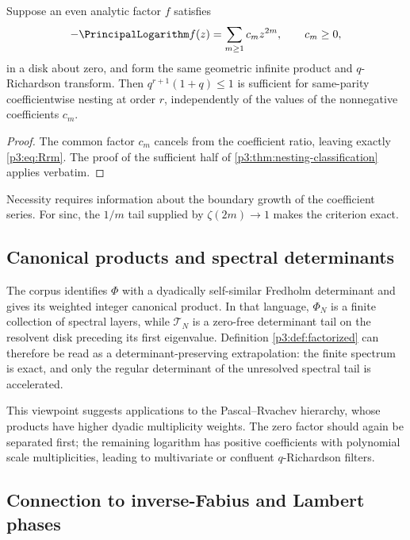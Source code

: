 \documentclass[11pt]{article}
\numberwithin{equation}{section}
\theoremstyle{definition}
\theoremstyle{remark}
\begin{document}
\begin{proposition}
\label{p3:prop:universal-mask}
Suppose an even analytic factor $f$ satisfies
\[
 -\PrincipalLogarithm f(z)=\sum_{m\ge1}c_mz^{2m},\qquad c_m\ge0,
\]
in a disk about zero, and form the same geometric infinite product and $q$-Richardson
transform.  Then $q^{r+1}(1+q)\le1$ is sufficient for same-parity coefficientwise nesting at
order $r$, independently of the values of the nonnegative coefficients $c_m$.
\end{proposition}

\begin{proof}
The common factor $c_m$ cancels from the coefficient ratio, leaving exactly
\eqref{p3:eq:Rrm}.  The proof of the sufficient half of
\cref{p3:thm:nesting-classification} applies verbatim.
\end{proof}

Necessity requires information about the boundary growth of the coefficient series.  For
sinc, the $1/m$ tail supplied by $\zeta(2m)\to1$ makes the criterion exact.

\subsection{Canonical products and spectral determinants}

The corpus identifies $\Phi$ with a dyadically self-similar Fredholm determinant and gives
its weighted integer canonical product.  In that language, $\Phi_N$ is a finite collection
of spectral layers, while $\mathcal T_N$ is a zero-free determinant tail on the resolvent
disk preceding its first eigenvalue.  Definition \ref{p3:def:factorized} can therefore be read
as a determinant-preserving extrapolation: the finite spectrum is exact, and only the
regular determinant of the unresolved spectral tail is accelerated.

This viewpoint suggests applications to the Pascal--Rvachev hierarchy, whose products have
higher dyadic multiplicity weights.  The zero factor should again be separated first; the
remaining logarithm has positive coefficients with polynomial scale multiplicities, leading
to multivariate or confluent $q$-Richardson filters.

\subsection{Connection to inverse-Fabius and Lambert phases}
\end{document}
